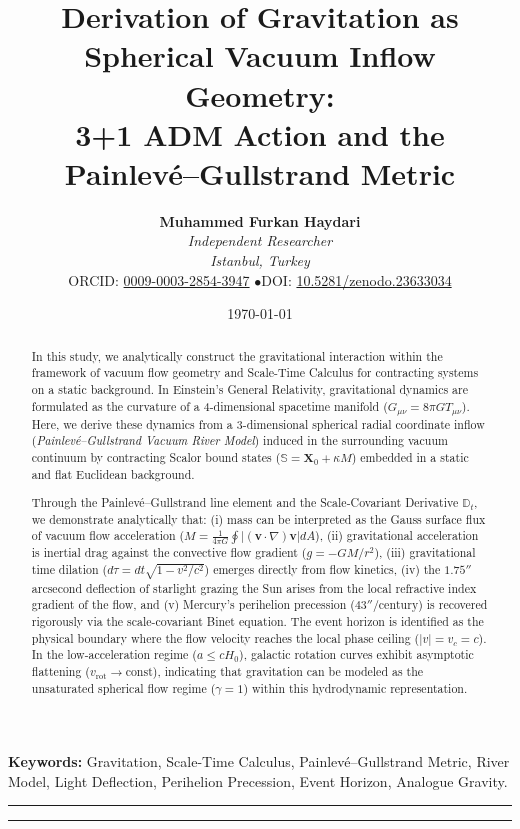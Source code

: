 \documentclass[11pt,a4paper]{article}
\title{\textbf{Derivation of Gravitation as Spherical Vacuum Inflow Geometry: \\ 3+1 ADM Action and the Painlev\'e--Gullstrand Metric}}
\author{
    \textbf{Muhammed Furkan Haydari} \\
    \textit{Independent Researcher} \\
    \textit{Istanbul, Turkey} \\
    \small ORCID: \href{https://orcid.org/0009-0003-2854-3947}{0009-0003-2854-3947} \quad$\bullet$\quad \small DOI: \href{https://doi.org/10.5281/zenodo.23633034}{10.5281/zenodo.23633034}
}
\date{\today}
\begin{document}
\maketitle

\begin{abstract}
    In this study, we analytically construct the gravitational interaction within the framework of vacuum flow geometry and Scale-Time Calculus for contracting systems on a static background. In Einstein's General Relativity, gravitational dynamics are formulated as the curvature of a 4-dimensional spacetime manifold ($G_{\mu\nu} = 8\pi G T_{\mu\nu}$). Here, we derive these dynamics from a 3-dimensional spherical radial coordinate inflow (\textit{Painlevé--Gullstrand Vacuum River Model}) induced in the surrounding vacuum continuum by contracting Scalor bound states ($\mathbb{S} = \mathbf{X}_0 + \kappa M$) embedded in a static and flat Euclidean background.

    Through the Painlev\'e--Gullstrand line element and the Scale-Covariant Derivative $\mathbb{D}_t$, we demonstrate analytically that: (i) mass can be interpreted as the Gauss surface flux of vacuum flow acceleration ($M = \frac{1}{4\pi G}\oint |(\mathbf{v}\cdot\nabla)\mathbf{v}| dA$), (ii) gravitational acceleration is inertial drag against the convective flow gradient ($g = -GM/r^2$), (iii) gravitational time dilation ($d\tau = dt\sqrt{1-v^2/c^2}$) emerges directly from flow kinetics, (iv) the $1.75''$ arcsecond deflection of starlight grazing the Sun arises from the local refractive index gradient of the flow, and (v) Mercury's perihelion precession ($43''/\text{century}$) is recovered rigorously via the scale-covariant Binet equation. The event horizon is identified as the physical boundary where the flow velocity reaches the local phase ceiling ($|v| = v_c = c$). In the low-acceleration regime ($a \le c H_0$), galactic rotation curves exhibit asymptotic flattening ($v_{\mathrm{rot}} \to \text{const}$), indicating that gravitation can be modeled as the unsaturated spherical flow regime ($\gamma = 1$) within this hydrodynamic representation.
\end{abstract}

\vspace{1em}
\noindent\textbf{Keywords:} Gravitation, Scale-Time Calculus, Painlev\'e--Gullstrand Metric, River Model, Light Deflection, Perihelion Precession, Event Horizon, Analogue Gravity.

\vspace{1em}
\hrule
\vspace{0.8em}
\tableofcontents
\vspace{0.8em}
\hrule
\vspace{1.5em}
\end{document}

